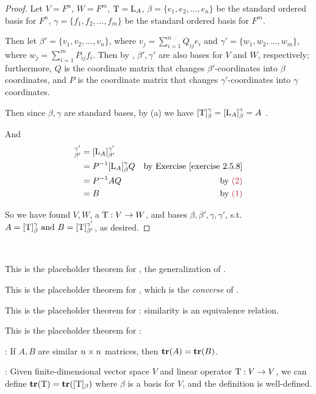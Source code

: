\begin{proof}
Let \(V = F^n\), \(W = F^m\), \(\mathrm{T} = \mathrm{L}_A\), \(\beta = \{ e_1, e_2, ..., e_n \}\) be the standard ordered basis for \(F^n\), \(\gamma = \{ f_1, f_2, ..., f_m \}\) be the standard ordered basis for \(F^m\).

Then let \(\beta' = \{ v_1, v_2, ..., v_n \}\), where \(v_j = \sum_{i = 1}^n Q_{ij} e_i\) and \(\gamma' = \{ w_1, w_2, ..., w_m \}\), where \(w_j = \sum_{i = 1}^m P_{ij} f_i\).
Then by , \(\beta', \gamma'\) are also bases for \(V\) and \(W\), respectively;
furthermore, \(Q\) is the coordinate matrix that changes \(\beta'\)-coordinates into \(\beta\) coordinates,
and \(P\) is the coordinate matrix that changes \(\gamma'\)-coordinates into \(\gamma\) coordinates.

Then since \(\beta, \gamma\) are standard bases, by (a) we have \([\mathrm{T}]_{\beta}^{\gamma} = [\mathrm{L}_A]_{\beta}^{\gamma} = A\) .

And
\begin{align*}
    [\T]_{\beta'}^{\gamma'}
        & = [\LMTRAN_A]_{\beta'}^{\gamma'} \\
        & = P^{-1} [\LMTRAN_A]_{\beta}^{\gamma} Q & \text{by \EXEC{2.5.8}} \\
        & = P^{-1} A Q & \text{by \MAROON{(2)}} \\
        & = B & \text{by \MAROON{(1)}}
\end{align*}

So we have found \(V, W\), a \LTRAN{} \(\mathrm{T} : V \to W\), and bases \(\beta, \beta', \gamma, \gamma'\), s.t. \(A = [\mathrm{T}]_{\beta}^{\gamma} \text{ and } B = [\mathrm{T}]_{\beta'}^{\gamma'}\), as desired.
\end{proof}

\begin{additional theorem} \label{athm 2.46} \ 

 This is the placeholder theorem for , the generalization of .

 This is the placeholder theorem for , which is the \emph{converse} of .
\end{additional theorem}

\begin{additional theorem} \label{athm 2.47}
This is the placeholder theorem for : similarity is an equivalence relation.
\end{additional theorem}

\begin{additional theorem} \label{athm 2.48}
This is the placeholder theorem for :

: If \(A, B\) are similar \(n \times n\) matrices, then \(\textbf{tr}(A) = \textbf{tr}(B)\).

: Given finite-dimensional vector space \(V\) and linear operator \(\mathrm{T} : V \to V\), we can define \(\textbf{tr}(\mathrm{T}) = \textbf{tr}([\mathrm{T}]_{\beta})\) where \(\beta\) is a basis for \(V\), and the definition is well-defined.
\end{additional theorem}

